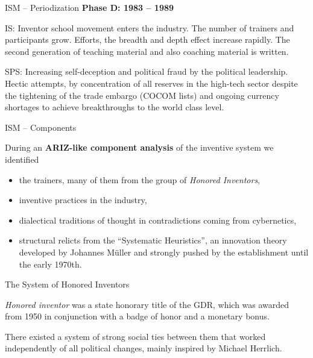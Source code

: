 \documentclass[11pt]{beamer}
\begin{document}
\begin{frame}{ISM -- Periodization}
\small
  \textbf{Phase D: 1983 -- 1989}

  IS: Inventor school movement enters the industry. The number of trainers and
  participants grow. Efforts, the breadth and depth effect increase rapidly.
  The second generation of teaching material and also coaching material is
  written.

  SPS: Increasing self-deception and political fraud by the political
  leadership.  Hectic attempts, by concentration of all reserves in the
  high-tech sector despite the tightening of the trade embargo (COCOM lists)
  and ongoing currency shortages to achieve breakthroughs to the world class
  level.

\end{frame}

\begin{frame}{ISM -- Components}

  During an \textbf{ARIZ-like component analysis} of the inventive system we
  identified
  \begin{itemize}
  \item the trainers, many of them from the group of \emph{Honored Inventors},
  \item inventive practices in the industry,
  \item dialectical traditions of thought in contradictions coming from
    cybernetics,
  \item structural relicts from the ``Systematic Heuristics'', an innovation
    theory developed by Johannes Müller and strongly pushed by the
    establishment until the early 1970th.
  \end{itemize}
\end{frame}

\begin{frame}{The System of Honored Inventors}
  
  \emph{Honored inventor} was a state honorary title of the GDR, which
  was awarded from 1950 in conjunction with a badge of honor and a monetary
  bonus.

  There existed a system of strong social ties between them that worked
  independently of all political changes, mainly inspired by Michael Herrlich.

\end{frame}
\end{document}
